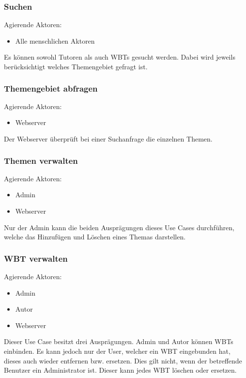 \subsubsection{Suchen}
Agierende Aktoren: \begin{itemize}
  \item Alle menschlichen Aktoren
\end{itemize}

Es können sowohl Tutoren als auch WBTs gesucht werden. Dabei wird jeweils
berücksichtigt welches Themengebiet gefragt ist.
	
\subsubsection{Themengebiet abfragen}
Agierende Aktoren: \begin{itemize}
  \item Webserver
\end{itemize}

Der Webserver überprüft bei einer Suchanfrage die einzelnen Themen.
	
\subsubsection{Themen verwalten}
Agierende Aktoren: \begin{itemize}
  \item Admin
  \item Webserver
\end{itemize}

Nur der Admin kann die beiden Ausprägungen dieses Use Cases durchführen, welche
das Hinzufügen und Löschen eines Themas darstellen.
	
\subsubsection{WBT verwalten}
Agierende Aktoren: \begin{itemize}
  \item Admin
  \item Autor
  \item Webserver
\end{itemize}

Dieser Use Case besitzt drei Ausprägungen. Admin und Autor können WBTs
einbinden. Es kann jedoch nur der User, welcher ein WBT eingebunden hat, dieses
auch wieder entfernen bzw. ersetzen. Dies gilt nicht, wenn der betreffende
Benutzer ein Administrator ist. Dieser kann jedes WBT löschen oder ersetzen.
	

